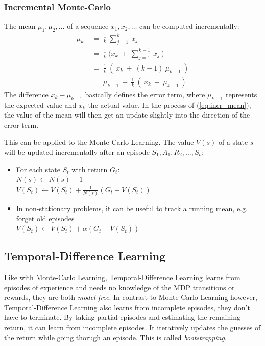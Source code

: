 \documentclass[10pt]{article}
\begin{document}
\subsubsection*{Incremental Monte-Carlo}
The mean $\mu_{1}, \mu_{2}, \ldots$ of a sequence $x_{1}, x_{2}, \ldots$ can be computed incrementally:
\begin{equation}
\begin{aligned}
\mu_{k}\; &=\;\frac{1}{k}\:\sum_{j=1}^{k}\:x_{j}\\
&=\;\frac{1}{k}\:\big( x_{k} \:+\: \sum_{j=1}^{k-1}\:x_{j}\: \big) \\
&=\;\frac{1}{k}\:(\:x_{k} \: + \: (k-1)\:\mu_{k-1} \: )\\
&=\; \mu_{k-1} \: + \: \frac{1}{k}\:(\:x_{k} \: - \:\mu_{k-1} \: )
\end{aligned}
\label{eq:incr_mean}
\end{equation}
The difference $x_{k} - \mu_{k-1}$ basically defines the error term, where $\mu_{k-1}$ represents the expected value and $x_{k}$ the actual value. In the process of (\ref{eq:incr_mean}), the value of the mean will then get an update slightly into the direction of the error term.

This can be applied to the Monte-Carlo Learning. The value $V(s)$ of a state $s$ will be updated incrementally after an episode $S_{1}, A_{1}, R_{2}, \ldots, S_{t}$:
\begin{itemize}
\item For each state $S_{t}$ with return $G_{t}$: \\
$N(s) \leftarrow N(s) + 1$ \\
$V(S_{t}) \leftarrow V(S_{t}) + \frac{1}{N(s)} (G_{t} - V(S_{t}))$
\item In non-stationary problems, it can be useful to track a running mean, e.g. forget old episodes \\
$V(S_{t}) \leftarrow V(S_{t}) + \alpha (G_{t} - V(S_{t}))$
\end{itemize}

\subsection*{Temporal-Difference Learning}
Like with Monte-Carlo Learning, Temporal-Difference Learning learns from episodes of experience and needs no knowledge of the MDP transitions or rewards, they are both \textit{model-free}. In contrast to Monte Carlo Learning however, Temporal-Difference Learning also learns from incomplete episodes, they don't have to terminate. By taking partial episodes and estimating the remaining return, it can learn from incomplete episodes. It iteratively updates the guesses of the return while going thorugh an episode. This is called \textit{bootstrapping}.
\end{document}
